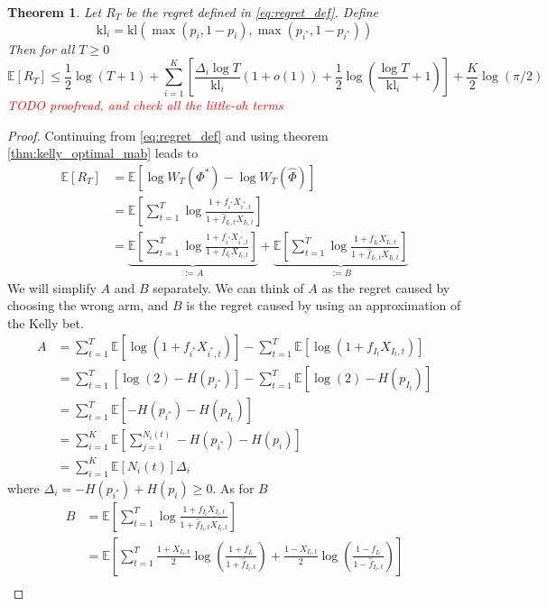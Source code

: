 \documentclass[letterpaper]{article}
\numberwithin{equation}{section}
\theoremstyle{plain}
\newtheorem{thm}{Theorem}[section]
\begin{document}
\begin{thm}
Let $R_T$ be the regret defined in \eqref{eq:regret_def}. Define
\begin{equation}
\text{kl}_i = \text{kl}(\max(p_i,1-p_i),\max(p_{i^*}, 1-p_{i^*}))
\end{equation}
Then for all $T\ge 0$
\begin{equation}
\mathbb{E}[R_T] \le \frac{1}{2}\log(T+1) + \sum_{i=1}^K \left[\frac{\Delta_i\log T}{\text{kl}_i}(1+o(1)) + \frac{1}{2} \log\left(\frac{\log T}{\text{kl}_i} + 1\right) \right] + \frac{K}{2} \log(\pi/2) 
\end{equation}
\textcolor{red}{TODO proofread, and check all the little-oh terms}
\end{thm}
\begin{proof}
Continuing from \eqref{eq:regret_def} and using theorem \ref{thm:kelly_optimal_mab} leads to
\begin{align}
\mathbb{E}[R_T] &= \mathbb{E}\left[\log W_T(\Phi^*) - \log W_T(\hat{\Phi})\right]\\
&=\mathbb{E}\left[\sum_{t=1}^T \log \frac{1+f_{i^*}X_{i^*,t}}{1+\hat{f}_{I_t,t}X_{I_t,t}} \right]\\
&=\underbrace{\mathbb{E}\left[\sum_{t=1}^T \log \frac{1+f_{i^*}X_{i^*,t}}{1+f_{I_t} X_{I_t,t}}\right]}_{:=A} + \underbrace{\mathbb{E}\left[\sum_{t=1}^T \log \frac{1+f_{I_t}X_{I_t,t}}{1+\hat{f}_{I_t,t}X_{I_t,t}} \right]}_{:=B}
\end{align}
We will simplify $A$ and $B$ separately. We can think of $A$ as the regret caused by choosing the wrong arm, and $B$ is the regret caused by using an approximation of the Kelly bet.
\begin{align}
A &= \sum_{t=1}^T \mathbb{E}[\log(1+f_{i^*}X_{i^*,t})] - \sum_{t=1}^T \mathbb{E}[\log(1+f_{I_t} X_{I_t,t})]\\
&= \sum_{t=1}^T  [\log(2) - H(p_{i^*})] - \sum_{t=1}^T \mathbb{E}[\log(2) - H(p_{I_t})]\\
&= \sum_{t=1}^T \mathbb{E}[-H(p_{i^*}) - H(p_{I_t})]\\
&= \sum_{i=1}^K \mathbb{E}\left[\sum_{j=1}^{N_i(t)} -H(p_{i^*}) - H(p_i) \right]\\
&= \sum_{i=1}^K \mathbb{E}[N_i(t)] \Delta_i
\end{align}
where $\Delta_i = - H(p_{i^*}) + H(p_i) \ge 0$. As for $B$
\begin{align}
B &=\mathbb{E}\left[\sum_{t=1}^T \log \frac{1+f_{I_t}X_{I_t,t}}{1+\hat{f}_{I_t,t}X_{I_t,t}} \right]\\
&= \mathbb{E}\left[\sum_{t=1}^T\frac{1+X_{I_t,t}}{2} \log\left(\frac{1+f_{I_t}}{1+\hat{f}_{I_t,t}}\right) + \frac{1-X_{I_t,t}}{2}\log\left(\frac{1-f_{I_t}}{1-\hat{f}_{I_t,t}}\right) \right]\\

\end{align}
\end{proof}
\end{document}
